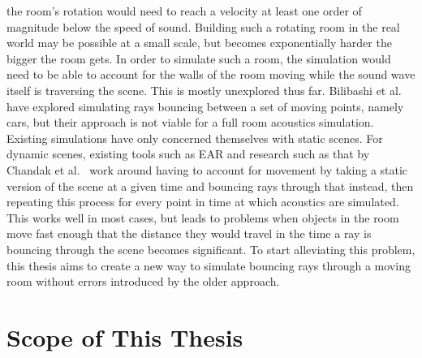 the room's rotation would need to reach a velocity at least one order of magnitude below the speed of sound.
Building such a rotating room in the real world may be possible at a small scale,
but becomes exponentially harder the bigger the room gets.
\newline
In order to simulate such a room, the simulation would need to be able to account for
the walls of the room moving while the sound wave itself is traversing the scene.
This is mostly unexplored thus far.
Bilibashi et al.~\cite{BVD20} have explored simulating rays bouncing between a set of moving points, namely cars,
but their approach is not viable for a full room acoustics simulation.
\newline
Existing simulations have only concerned themselves with static scenes.
For dynamic scenes, existing tools such as EAR and research such as that by Chandak et al.~\cite{Cha08}
work around having to account for movement by taking a static version of the scene at a given time
and bouncing rays through that instead,
then repeating this process for every point in time at which acoustics are simulated.
\newline
This works well in most cases, but leads to problems when objects in the room move fast enough
that the distance they would travel in the time a ray is bouncing through the scene becomes significant.
To start alleviating this problem,
this thesis aims to create a new way to simulate bouncing rays through a moving room without errors introduced by the older approach.

\section{Scope of This Thesis}

